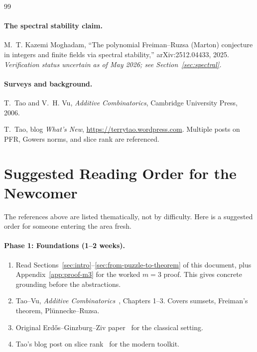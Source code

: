 \documentclass[11pt,a4paper]{article}
\theoremstyle{plain}
\theoremstyle{definition}
\theoremstyle{remark}
\begin{document}
\begin{thebibliography}{99}
\paragraph{The spectral stability claim.}

M.~T. Kazemi Moghadam, ``The polynomial Freiman--Ruzsa (Marton) conjecture in integers and finite fields via spectral stability,'' arXiv:2512.04433, 2025. \emph{Verification status uncertain as of May 2026; see Section~\ref{sec:spectral}.}

\paragraph{Surveys and background.}

T.~Tao and V.~H. Vu, \emph{Additive Combinatorics}, Cambridge University Press, 2006.

T.~Tao, blog \emph{What's New}, \url{https://terrytao.wordpress.com}. Multiple posts on PFR, Gowers norms, and slice rank are referenced.

\end{thebibliography}

\section{Suggested Reading Order for the Newcomer}

The references above are listed thematically, not by difficulty. Here is a suggested order for someone entering the area fresh.

\paragraph{Phase 1: Foundations (1--2 weeks).}
\begin{enumerate}[leftmargin=2em]
  \item Read Sections~\ref{sec:intro}--\ref{sec:from-puzzle-to-theorem} of this document, plus Appendix~\ref{app:proof-m3} for the worked $m=3$ proof. This gives concrete grounding before the abstractions.
  \item Tao--Vu, \emph{Additive Combinatorics}~\cite{taovu2006}, Chapters 1--3. Covers sumsets, Freiman's theorem, Plünnecke--Ruzsa.
  \item Original Erd\H{o}s--Ginzburg--Ziv paper~\cite{egz1961} for the classical setting.
  \item Tao's blog post on slice rank~\cite{tao2016sliceblog} for the modern toolkit.
\end{enumerate}
\end{document}
